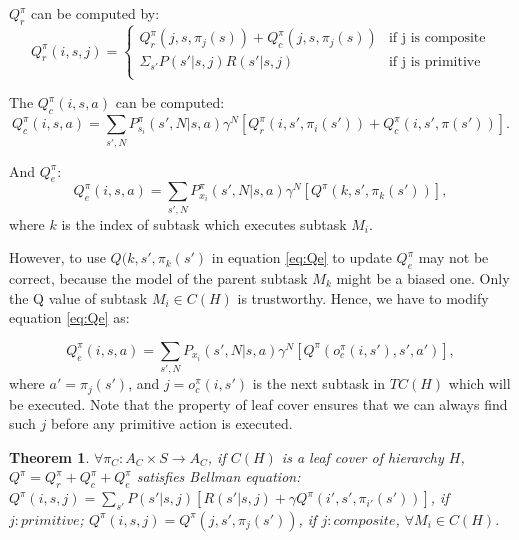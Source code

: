 \documentclass{article} %
\newtheorem{theorem}{Theorem}
\begin{document}


$Q_r^{\pi}$ can be computed by:
\begin{equation}
    Q_r^{\pi}(i, s, j) = 
    \left\{\begin{array}{ll}
        Q_r^{\pi}(j, s, \pi_j(s)) + Q_c^{\pi}(j, s, \pi_j(s))& \mbox{if j is composite} \\
        \Sigma_{s'} P(s'|s, j)R(s'|s, j) & \mbox{if j is primitive} \\  
    \end{array} \right.
    \label{eq:Qr}
\end{equation}

The $Q_c^{\pi}(i, s, a)$ can be computed:
\begin{equation}
    Q_c^{\pi}(i, s, a) = \sum_{s', N} P_{s_i}^{\pi}(s', N|s, a)\gamma^N[Q_r^{\pi}(i, s', \pi_i(s')) + Q_c^{\pi}(i, s', \pi(s'))].
    \label{eq:Qc}
\end{equation}


And $Q_e^{\pi}$:
\begin{equation}
    Q_e^{\pi}(i, s, a) = \sum_{s', N} P_{x_i}^{\pi}(s', N|s, a)\gamma^N[Q^{\pi}(k, s', \pi_k(s'))],
    \label{eq:Qe}
\end{equation}
where $k$ is the index of subtask which executes subtask $M_i$.

However, to use $Q(k, s', \pi_k(s')$ in equation \ref{eq:Qe} to update $Q_e^{\pi}$ may not be correct, because the model
of the parent subtask $M_k$ might be a biased one. Only the Q value of subtask $M_i \in C(H)$ is trustworthy.
Hence, we have to modify equation \ref{eq:Qe} as:

\begin{equation}
    Q_e^{\pi}(i, s, a) = \sum_{s', N} P_{x_i}(s', N|s, a)\gamma^N[Q^{\pi}(o_c^{\pi}(i, s'), s', a')],
    \label{eq:OptQe}
\end{equation}
where $a' = \pi_j(s')$, and $j = o_c^{\pi}(i, s')$ is the next subtask in $TC(H)$ which will be executed. 
Note that the property of leaf cover ensures that we can always find such $j$ before any primitive
action is executed. %



\begin{theorem}
    $\forall \pi_{C}: A_C \times S \rightarrow A_C$,   
    if $C(H)$ is a leaf cover of hierarchy $H$, $Q^{\pi} = Q_r^{\pi} + Q_c^{\pi} + Q_e^{\pi}$ satisfies 
    Bellman equation:
    $Q^{\pi}(i, s, j) = \sum_{s'}P(s'|s, j)[R(s'|s, j) + \gamma Q^{\pi}(i', s', \pi_{i'}(s'))]$,
    if $j: primitive$; $Q^{\pi}(i, s, j) = Q^{\pi}(j, s', \pi_{j}(s'))$, if $j:composite$, $\forall M_i \in C(H)$.
    \label{thm:Bell}
\end{theorem}
\end{document}
